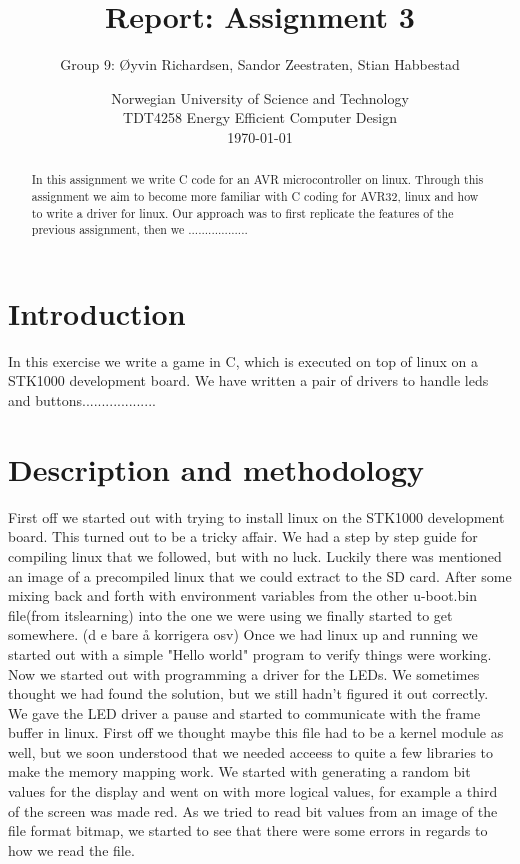 \documentclass[a4paper,11pt]{article}
\title{\textbf{Report: Assignment 3}}
\author{Group 9: \O yvin Richardsen, Sandor Zeestraten, Stian Habbestad}
\date{{Norwegian University of Science and Technology \\
TDT4258 Energy Efficient Computer Design \\}
\today}
\begin{document}
\maketitle

\begin{abstract}


In this assignment we write C code for an AVR microcontroller on linux. Through this assignment we aim to become more familiar with C coding for AVR32, linux and how to write a driver for linux. Our approach was to first replicate the features of the previous assignment, then we ..................
\end{abstract}

\bigskip
\tableofcontents
\newpage

\section{Introduction}

In this exercise we write a game in C, which is executed on top of linux on a STK1000 development board. We have written a pair of drivers to handle leds and buttons...................

\section{Description and methodology}

First off we started out with trying to install linux on the STK1000 development board. This turned out to be a tricky affair. We had a step by step guide for compiling linux that we followed, but with no luck. Luckily there was mentioned an image of a precompiled linux that we could extract to the SD card. After some mixing back and forth with environment variables from the other u-boot.bin file(from itslearning) into the one we were using we finally started to get somewhere. (d e bare å korrigera osv) 
Once we had linux up and running we started out with a simple "Hello world" program to verify things were working. Now we started out with programming a driver for the LEDs. We sometimes thought we had found the solution, but we still hadn't figured it out correctly. We gave the LED driver a pause and started to communicate with the frame buffer in linux. First off we thought maybe this file had to be a kernel module as well, but we soon understood that we needed acceess to quite a few libraries to make the memory mapping work. We started with generating a random bit values for the display and went on with more logical values, for example a third of the screen was made red. As we tried to read bit values from an image of the file format bitmap, we started to see that there were some errors in regards to how we read the file. 
\end{document}
